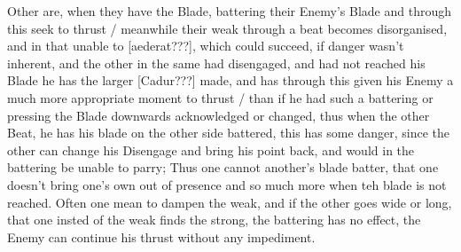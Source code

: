 Other are, when they have the Blade, battering their Enemy's Blade and
through this seek to thrust / meanwhile their weak through a beat
becomes disorganised, and in that unable to [aederat???], which could
succeed, if  danger wasn't inherent, and the other in the same had
disengaged, and had not reached his Blade he has the larger [Cadur???]
made, and has through this given his Enemy a much more appropriate
moment to thrust / than if he had such a battering or pressing the
Blade downwards acknowledged or changed, thus when the other Beat, he
has his blade on the other side battered, this has some danger, since
the other can change his Disengage and bring his point back, and would in
the battering be unable to parry; Thus one cannot another's blade
batter, that one doesn't bring one's own out of
presence and so much more when teh blade is not
reached. Often one mean to dampen the weak, and if the other goes wide
or long, that one insted of the weak finds the strong, the battering
has no effect, the Enemy can continue his thrust without any impediment.


